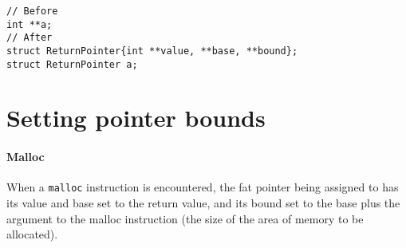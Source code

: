 \begin{verbatim}
// Before
int **a;
// After
struct ReturnPointer{int **value, **base, **bound};
struct ReturnPointer a;
\end{verbatim}

%
%
%
%
%
%
%

\section{Setting pointer bounds}

\paragraph{Malloc} 
When a \verb!malloc! instruction is encountered, the fat pointer being assigned to has its value and base set to the return value, and its bound set to the base plus the argument to the malloc instruction (the size of the area of memory to be allocated).



